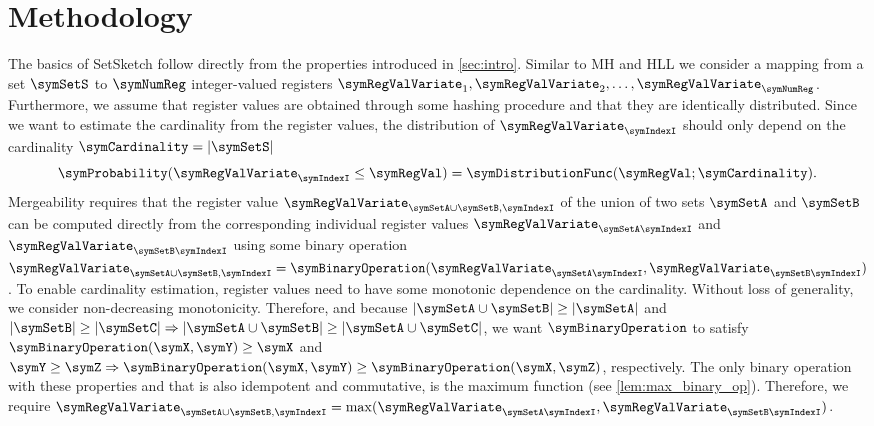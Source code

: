 \documentclass[sigconf, nonacm]{acmart}
\newif\ifextended\extendedtrue
\begin{document}
\section{Methodology}
The basics of SetSketch follow directly from the properties introduced in \cref{sec:intro}. Similar to \ac{MH} and \ac{HLL} we consider a mapping from a set $\symSetS$ to $\symNumReg$ integer-valued registers $\symRegValVariate_1,\symRegValVariate_2,\ldots,\symRegValVariate_\symNumReg$. Furthermore, we assume that register values are obtained through some hashing procedure and that they are identically distributed. Since we want to estimate the cardinality from the register values, the distribution of 
$\symRegValVariate_\symIndexI$ should only depend on the cardinality $\symCardinality = |\symSetS|$
\begin{equation*}
\symProbability(\symRegValVariate_\symIndexI\leq \symRegVal) = \symDistributionFunc(\symRegVal;\symCardinality).
\end{equation*}
Mergeability requires that the register value $\symRegValVariate_{\symSetA\cup\symSetB,\symIndexI}$ of the union of two sets $\symSetA$ and $\symSetB$ can be computed directly from the corresponding individual register values $\symRegValVariate_{\symSetA\symIndexI}$ and $\symRegValVariate_{\symSetB\symIndexI}$ using some binary operation $\symRegValVariate_{\symSetA\cup\symSetB,\symIndexI}=\symBinaryOperation(\symRegValVariate_{\symSetA\symIndexI}, \symRegValVariate_{\symSetB\symIndexI})$.
To enable cardinality estimation, register values need to have some monotonic dependence on the cardinality. Without loss of generality, we consider non-decreasing monotonicity. Therefore, and because $|\symSetA\cup\symSetB|\geq|\symSetA|$ and $|\symSetB|\geq |\symSetC| \Rightarrow |\symSetA\cup\symSetB| \geq |\symSetA\cup\symSetC|$, we want $\symBinaryOperation$ to satisfy $\symBinaryOperation(\symX,\symY)\geq \symX$ and $\symY\geq\symZ \Rightarrow \symBinaryOperation(\symX,\symY) \geq \symBinaryOperation(\symX,\symZ)$, respectively. The only binary operation with these properties and that is also idempotent and commutative, is the maximum function \ifextended (see \cref{lem:max_binary_op})\else\cite{Ertl2021}\fi. Therefore, we require
$\symRegValVariate_{\symSetA\cup\symSetB,\symIndexI} = \max(\symRegValVariate_{\symSetA\symIndexI}, \symRegValVariate_{\symSetB\symIndexI})$.
\end{document}
